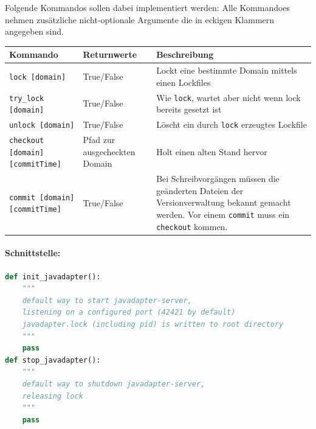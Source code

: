 Folgende Kommandos sollen dabei implementiert werden:
Alle Kommandoes nehmen zusätzliche nicht-optionale Argumente die in
eckigen Klammern angegeben sind.
\begin{table}[H]
  \begin{tabular}{|p{4cm}|p{5cm}|p{7cm}|}
    \hline
    \textbf{Kommando} & \textbf{Returnwerte} & \textbf{Beschreibung} \\
    \hline
    \texttt{lock [domain]} 
    & True/False 
    & Lockt eine bestimmte Domain mittels einen Lockfiles 
    \\
    \hline
    \texttt{try\_lock [domain]} 
    & True/False 
    & Wie \texttt{lock}, wartet aber nicht wenn lock bereits gesetzt ist 
    \\
    \hline
    \texttt{unlock [domain]} 
    & True/False 
    & Löscht ein durch \texttt{lock} erzeugtes Lockfile 
    \\
    \hline
    \texttt{checkout [domain] [commitTime]} 
    & Pfad zur ausgecheckten Domain
    & Holt einen alten Stand hervor
    \\
    \hline
    \texttt{commit [domain] [commitTime]} 
    & True/False 
    & Bei Schreibvorgängen müssen die geänderten Dateien
      der Versionverwaltung bekannt gemacht werden.
      Vor einem \texttt{commit} muss ein \texttt{checkout} kommen.
    \\
    \hline
  \end{tabular}
\end{table}

\paragraph{Schnittstelle:}
\label{par:schnittstelle_}
\hfill
\begin{lstlisting}[language=python]
def init_javadapter():
    """
    default way to start javadapter-server,
    listening on a configured port (42421 by default)
    javadapter.lock (including pid) is written to root directory
    """
    pass
def stop_javadapter():
    """
    default way to shutdown javadapter-server,
    releasing lock
    """
    pass
\end{lstlisting}
